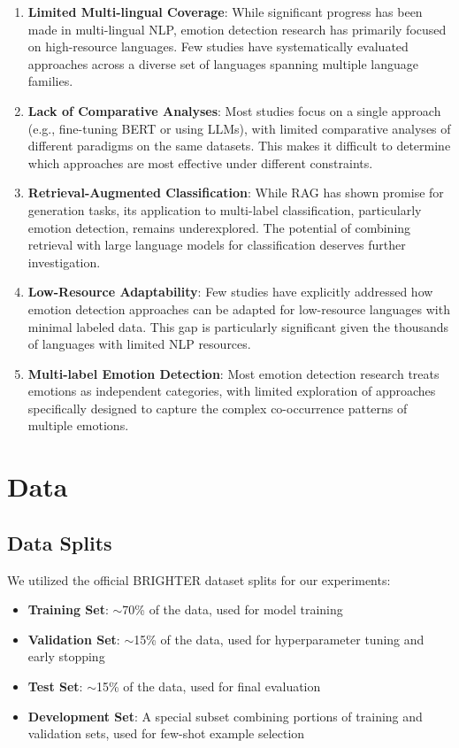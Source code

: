 \documentclass[a4paper,12pt]{extarticle}
\begin{document}
\begin{enumerate}
    \item \textbf{Limited Multi-lingual Coverage}: While significant progress has been made in multi-lingual NLP, emotion detection research has primarily focused on high-resource languages. Few studies have systematically evaluated approaches across a diverse set of languages spanning multiple language families.

    \item \textbf{Lack of Comparative Analyses}: Most studies focus on a single approach (e.g., fine-tuning BERT or using LLMs), with limited comparative analyses of different paradigms on the same datasets. This makes it difficult to determine which approaches are most effective under different constraints.

    \item \textbf{Retrieval-Augmented Classification}: While RAG has shown promise for generation tasks, its application to multi-label classification, particularly emotion detection, remains underexplored. The potential of combining retrieval with large language models for classification deserves further investigation.

    \item \textbf{Low-Resource Adaptability}: Few studies have explicitly addressed how emotion detection approaches can be adapted for low-resource languages with minimal labeled data. This gap is particularly significant given the thousands of languages with limited NLP resources.

    \item \textbf{Multi-label Emotion Detection}: Most emotion detection research treats emotions as independent categories, with limited exploration of approaches specifically designed to capture the complex co-occurrence patterns of multiple emotions.
\end{enumerate}

\section{Data}

\subsection{Data Splits}

We utilized the official BRIGHTER dataset splits for our experiments:

\begin{itemize}
\item \textbf{Training Set}: $\sim$70\% of the data, used for model training
\item \textbf{Validation Set}: $\sim$15\% of the data, used for hyperparameter tuning and early stopping
\item \textbf{Test Set}: $\sim$15\% of the data, used for final evaluation
\item \textbf{Development Set}: A special subset combining portions of training and validation sets, used for few-shot example selection
\end{itemize}
\end{document}
